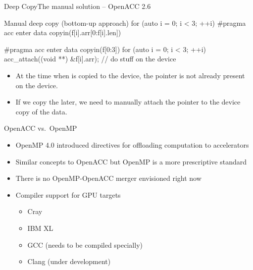 \documentclass[12pt,aspectratio=169]{beamer}
\begin{document}
\begin{frame}[fragile]{Deep Copy}{The manual solution -- OpenACC 2.6}
  \vspace{.5\baselineskip}
  \begin{Cpplisting}{Manual deep copy (bottom-up approach)}
for (auto i = 0; i < 3; ++i) {
    #pragma acc enter data copyin(f[i].arr[0:f[i].len])
}

#pragma acc enter data copyin(f[0:3])
for (auto i = 0; i < 3; ++i) {
    acc_attach((void **) &f[i].arr);
}
// do stuff on the device
  \end{Cpplisting}
  \begin{itemize}
  \item At the time when  is copied to the device, the pointer is not already present on the device.
  \item If we copy the  later, we need to manually attach the pointer to the device copy of the data.
  \end{itemize}
\end{frame}

\begin{frame}{OpenACC vs.\ OpenMP}
  \begin{itemize}
    \vfill
  \item OpenMP 4.0 introduced directives for offloading computation to accelerators
    \vfill
  \item Similar concepts to OpenACC but OpenMP is a more prescriptive standard
    \vfill
  \item There is no OpenMP-OpenACC merger envisioned right now
    \vfill
  \item Compiler support for GPU targets
    \begin{itemize}
    \item Cray
    \item IBM XL
    \item GCC (needs to be compiled specially)
    \item Clang (under development)
    \end{itemize}
  \end{itemize}
\end{frame}
\end{document}
